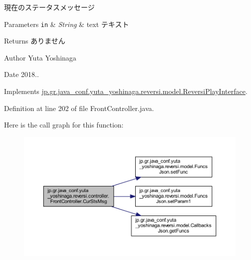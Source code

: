 現在のステータスメッセージ 


\begin{DoxyParams}[1]{Parameters}
\mbox{\tt in}  & {\em String} & text テキスト \\
\hline
\end{DoxyParams}
\begin{DoxyReturn}{Returns}
ありません 
\end{DoxyReturn}
\begin{DoxyAuthor}{Author}
Yuta Yoshinaga 
\end{DoxyAuthor}
\begin{DoxyDate}{Date}
2018.. 
\end{DoxyDate}


Implements \mbox{\hyperlink{interfacejp_1_1gr_1_1java__conf_1_1yuta__yoshinaga_1_1reversi_1_1model_1_1_reversi_play_interface}{jp.\+gr.\+java\+\_\+conf.\+yuta\+\_\+yoshinaga.\+reversi.\+model.\+Reversi\+Play\+Interface}}.



Definition at line 202 of file Front\+Controller.\+java.

Here is the call graph for this function\+:
\nopagebreak
\begin{figure}[H]
\begin{center}
\leavevmode
\includegraphics[width=350pt]{classjp_1_1gr_1_1java__conf_1_1yuta__yoshinaga_1_1reversi_1_1controller_1_1_front_controller_a49315230e704778721afb73c59e14d88_cgraph}
\end{center}
\end{figure}
\mbox{\label{classjp_1_1gr_1_1java__conf_1_1yuta__yoshinaga_1_1reversi_1_1controller_1_1_front_controller_a2f0d63da6e6fc17d2ecf2695af6f8d99}} 

